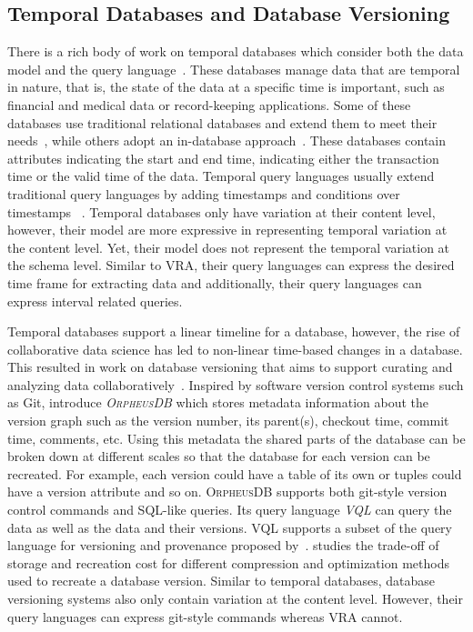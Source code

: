 \subsection{Temporal Databases and Database Versioning}
\label{sec:db-ver}

There is a rich body of work on temporal databases which consider both the data model and the query language~\cite{tempDataMng, tempDBSurv, tempDBbook}.
These databases manage data that are temporal in nature, that is, the state of the data at a specific
time is important, such as financial and medical data or record-keeping applications. 
%
Some of these databases use traditional relational databases and extend them to meet their 
needs~\cite{stratum,Teradata, db2}, while others adopt an in-database 
approach~\cite{KaufmannMVFKFM13sigmod}.
%
These databases contain attributes indicating the start and end time, indicating either 
the transaction time or the valid time of the data. Temporal query languages usually extend 
traditional query languages by adding timestamps and conditions over 
timestamps ~\cite{chomicki95,Jensen2009,evalTempLang}.
%
Temporal databases only have variation at their content level, however, their model are more expressive in representing temporal variation at the content level. Yet, their model does not represent the temporal variation at the schema level. Similar to VRA, their query languages can express
the desired time frame for extracting data and additionally, their query languages can express
interval related queries.


Temporal databases support a linear timeline for a database, however, the rise of collaborative data 
science has led to non-linear time-based changes in a database. 
This resulted in work on database versioning that aims to support curating and analyzing data 
collaboratively~\cite{datahub15cidr}. Inspired by software version control systems such as Git, 
\citet{dbVersioning} introduce \emph{\textsc{OrpheusDB}} which stores metadata information
about the version graph such as 
the version number, its parent(s), checkout time, commit time, comments, etc. 
Using this metadata the shared parts of the database can be broken down at different scales so
that the database for each version can be recreated.
For example, each version could have a table of its own or 
tuples could have a version attribute and so on. 
\textsc{OrpheusDB} supports both git-style version control 
commands and SQL-like queries. Its query language \emph{VQL} can query the data 
as well as the data and their versions. VQL supports a subset of the query language for 
versioning and provenance proposed by~\citet{vqlAndProv}. 
\citet{datasetVersioning} studies the trade-off of storage and recreation cost for 
different compression and optimization methods used to recreate a database version.
%
Similar to temporal databases, database versioning systems also only contain variation
at the content level. However, their query languages can express git-style commands
whereas VRA cannot. 


